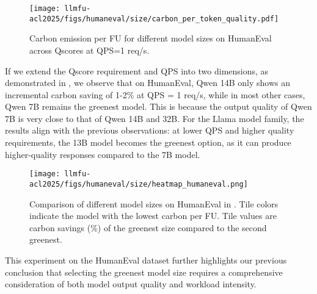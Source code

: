 \begin{figure}[!t]
    \centering
    \texttt{[image: llmfu-acl2025/figs/humaneval/size/carbon\_per\_token\_quality.pdf]}
    \caption{Carbon emission per FU for different model sizes on HumanEval across Qscores at QPS=1 req/s.}
    \label{fig:humaneval_size_carbon_per_token_quality}
\end{figure}



If we extend the Qscore requirement and QPS into two dimensions, as demonstrated in , we observe that on HumanEval, Qwen 14B only shows an incremental carbon saving of 1-2\% at QPS = 1 req/s, while in most other cases, Qwen 7B remains the greenest model. This is because the output quality of Qwen 7B is very close to that of Qwen 14B and 32B. For the Llama model family, the results align with the previous observations: at lower QPS and higher quality requirements, the 13B model becomes the greenest option, as it can produce higher-quality responses compared to the 7B model.


\begin{figure}[!t]
    \centering
    \texttt{[image: llmfu-acl2025/figs/humaneval/size/heatmap\_humaneval.png]}
    \caption{Comparison of different model sizes on HumanEval in \SYSTEM{}. Tile colors indicate the model with the lowest carbon per FU. Tile values are carbon savings (\%) of the greenest size compared to the second greenest.}
    \label{fig:humaneval_size_heatmap}
\end{figure}

This experiment on the HumanEval dataset further highlights our previous conclusion that selecting the greenest model size requires a comprehensive consideration of both model output quality and workload intensity.



